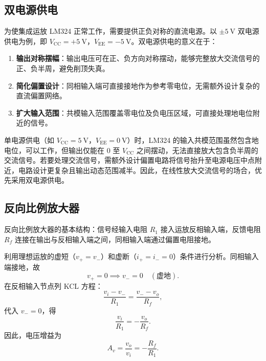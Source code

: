 \documentclass[12pt]{ctexart}
\begin{document}
\subsection{双电源供电}

为使集成运放 LM324 正常工作，需要提供正负对称的直流电源。以 $\pm\SI{5}{\volt}$ 双电源供电为例，即 $V_{\mathrm{CC}}=+\SI{5}{\volt}$，$V_{\mathrm{EE}}=-\SI{5}{\volt}$。双电源供电的意义在于：

\begin{enumerate}[label=(\arabic*)]
    \item \textbf{输出对称摆幅}：输出电压可在正、负方向对称摆动，能够完整放大交流信号的正、负半周，避免削顶失真。
    \item \textbf{简化偏置设计}：同相输入端可直接接地作为参考零电位，无需额外设计复杂的直流偏置网络。
    \item \textbf{扩大输入范围}：共模输入范围覆盖零电位及负电压区域，可直接处理地电位附近的信号。
\end{enumerate}

单电源供电（如 $V_{\mathrm{CC}}=\SI{5}{\volt}$，$V_{\mathrm{EE}}=\SI{0}{\volt}$）时，LM324 的输入共模范围虽然包含地电位，可以工作，但输出仅能在 $0$ 至 $V_{\mathrm{CC}}$ 之间摆动，无法直接放大包含负半周的交流信号。若要处理交流信号，需额外设计偏置电路将信号抬升至电源电压中点附近，电路设计更复杂且输出动态范围减半。因此，在线性放大交流信号的场合，优先采用双电源供电。

\subsection{反向比例放大器}

反向比例放大器的基本结构：信号经输入电阻 $R_1$ 接入运放反相输入端，反馈电阻 $R_f$ 连接在输出与反相输入端之间，同相输入端通过偏置电阻接地。

利用理想运放的虚短（$v_+ = v_-$）和虚断（$i_+ = i_- = 0$）条件进行分析。同相输入端接地，故
\begin{equation}
    v_+ = 0 \implies v_- = 0 \quad (\text{虚地}).
\end{equation}
在反相输入节点列 KCL 方程：
\begin{equation}
    \frac{v_i - v_-}{R_1} = \frac{v_- - v_o}{R_f},
\end{equation}
代入 $v_- = 0$，得
\begin{equation}
    \frac{v_i}{R_1} = -\frac{v_o}{R_f}.
\end{equation}
因此，电压增益为
\begin{equation}
    A_v = \frac{v_o}{v_i} = -\frac{R_f}{R_1}.
    \label{eq:inverting-gain}
\end{equation}
\end{document}
